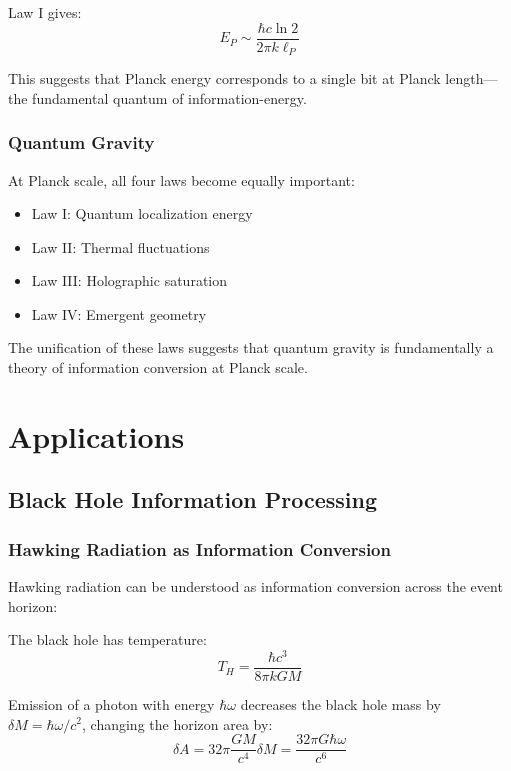 \documentclass[11pt,a4paper]{article}
\theoremstyle{plain}
\theoremstyle{definition}
\theoremstyle{remark}
\begin{document}
Law I gives:
\begin{equation}
E_P \sim \frac{\hbar c\ln 2}{2\pi k\ell_P}
\end{equation}

This suggests that Planck energy corresponds to a single bit at Planck length—the fundamental quantum of information-energy.

\subsubsection{Quantum Gravity}

At Planck scale, all four laws become equally important:
\begin{itemize}[leftmargin=*]
\item Law I: Quantum localization energy
\item Law II: Thermal fluctuations
\item Law III: Holographic saturation
\item Law IV: Emergent geometry
\end{itemize}

The unification of these laws suggests that quantum gravity is fundamentally a theory of information conversion at Planck scale.

\section{Applications}
\label{sec:applications}

\subsection{Black Hole Information Processing}

\subsubsection{Hawking Radiation as Information Conversion}

Hawking radiation can be understood as information conversion across the event horizon:

The black hole has temperature:
\begin{equation}
T_H = \frac{\hbar c^3}{8\pi kGM}
\end{equation}

Emission of a photon with energy $\hbar\omega$ decreases the black hole mass by $\delta M = \hbar\omega/c^2$, changing the horizon area by:
\begin{equation}
\delta A = 32\pi\frac{GM}{c^4}\delta M = \frac{32\pi G\hbar\omega}{c^6}
\end{equation}
\end{document}
